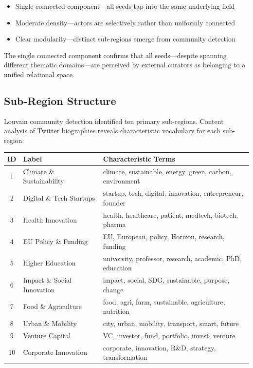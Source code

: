 \documentclass[../main.tex]{subfiles}
\begin{document}
\begin{itemize}
    \item Single connected component---all seeds tap into the same underlying field
    \item Moderate density---actors are selectively rather than uniformly connected
    \item Clear modularity---distinct sub-regions emerge from community detection
\end{itemize}

The single connected component confirms that all seeds---despite spanning different thematic domains---are perceived by external curators as belonging to a unified relational space.


\subsection{Sub-Region Structure}

Louvain community detection identified ten primary sub-regions. Content analysis of Twitter biographies reveals characteristic vocabulary for each sub-region:

\begin{center}
\small
\begin{tabular}{clp{5cm}}
\toprule
\textbf{ID} & \textbf{Label} & \textbf{Characteristic Terms} \\
\midrule
1 & Climate \& Sustainability & climate, sustainable, energy, green, carbon, environment \\
2 & Digital \& Tech Startups & startup, tech, digital, innovation, entrepreneur, founder \\
3 & Health Innovation & health, healthcare, patient, medtech, biotech, pharma \\
4 & EU Policy \& Funding & EU, European, policy, Horizon, research, funding \\
5 & Higher Education & university, professor, research, academic, PhD, education \\
6 & Impact \& Social Innovation & impact, social, SDG, sustainable, purpose, change \\
7 & Food \& Agriculture & food, agri, farm, sustainable, agriculture, nutrition \\
8 & Urban \& Mobility & city, urban, mobility, transport, smart, future \\
9 & Venture Capital & VC, investor, fund, portfolio, invest, venture \\
10 & Corporate Innovation & corporate, innovation, R\&D, strategy, transformation \\
\bottomrule
\end{tabular}
\end{center}
\end{document}
